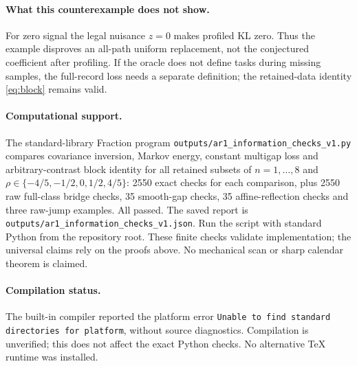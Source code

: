 \documentclass[11pt]{article}
\begin{document}
\paragraph{What this counterexample does not show.}
For zero signal the legal nuisance $z=0$ makes profiled KL zero. Thus the
example disproves an all-path uniform replacement, not the conjectured
coefficient after profiling. If the oracle does not define tasks during
missing samples, the full-record loss needs a separate definition; the
retained-data identity \eqref{eq:block} remains valid.

\paragraph{Computational support.}
The standard-library Fraction program
\texttt{outputs/ar1\_information\_checks\_v1.py} compares covariance inversion,
Markov energy, constant multigap loss and arbitrary-contrast block identity
for all retained subsets of $n=1,\ldots,8$ and
$\rho\in\{-4/5,-1/2,0,1/2,4/5\}$: 2550 exact checks for each comparison,
plus 2550 raw full-class bridge checks, 35 smooth-gap checks,
35 affine-reflection checks and three raw-jump examples. All passed.
The saved report is \texttt{outputs/ar1\_information\_checks\_v1.json}.
Run the script with standard Python from the repository root.
These finite checks validate implementation; the universal claims rely on
the proofs above. No mechanical scan or sharp calendar theorem is claimed.
\paragraph{Compilation status.}
The built-in compiler reported the platform error
\texttt{Unable to find standard directories for platform}, without source
diagnostics. Compilation is unverified; this does not affect the exact Python
checks. No alternative TeX runtime was installed.
\end{document}
